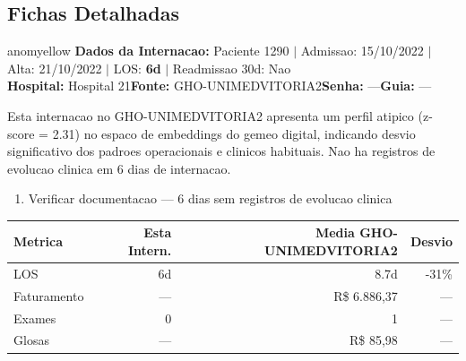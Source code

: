 \documentclass[a4paper,10pt]{article}
\begin{document}
\subsection{Fichas Detalhadas}
\begin{anomalycard}[Internacao 1219 | GHO-UNIMEDVITORIA2 | MODERADO (z=2.31)]{anomyellow}
\textbf{Dados da Internacao:} Paciente 1290 $\mid$ Admissao: 15/10/2022 $\mid$ Alta: 21/10/2022 $\mid$ LOS: \textbf{6d} $\mid$ Readmissao 30d: Nao\\
\textbf{Hospital:} Hospital 21\quad\textbf{Fonte:} GHO-UNIMEDVITORIA2\quad\textbf{Senha:} ---\quad\textbf{Guia:} ---\\
\vspace{2pt}\begin{tcolorbox}[colback=severityred!20,colframe=anomyellow,title={\textbf{Interpretacao de Negocio}},fonttitle=\bfseries\small,left=4pt,right=4pt,top=3pt,bottom=3pt]
{\small Esta internacao no GHO-UNIMEDVITORIA2 apresenta um perfil atipico (z-score = 2.31) no espaco de embeddings do gemeo digital, indicando desvio significativo dos padroes operacionais e clinicos habituais. Nao ha registros de evolucao clinica em 6 dias de internacao.}
\end{tcolorbox}
\begin{tcolorbox}[colback=severityyellow!30,colframe=anomorange,title={\textbf{Recomendacoes Especificas}},fonttitle=\bfseries\small,left=4pt,right=4pt,top=3pt,bottom=3pt]
\begin{enumerate}[nosep,leftmargin=16pt]
\item {\small Verificar documentacao --- 6 dias sem registros de evolucao clinica}
\end{enumerate}
\end{tcolorbox}
\begin{center}\begin{tabular}{l r r r}\toprule\textbf{Metrica} & \textbf{Esta Intern.} & \textbf{Media GHO-UNIMEDVITORIA2} & \textbf{Desvio} \\\midrule
LOS & 6d & 8.7d & -31\% \\
Faturamento & --- & R\$ 6.886,37 & --- \\
Exames & 0 & 1 & --- \\
Glosas & --- & R\$ 85,98 & --- \\
\bottomrule\end{tabular}\end{center}


\end{anomalycard}
\end{document}
